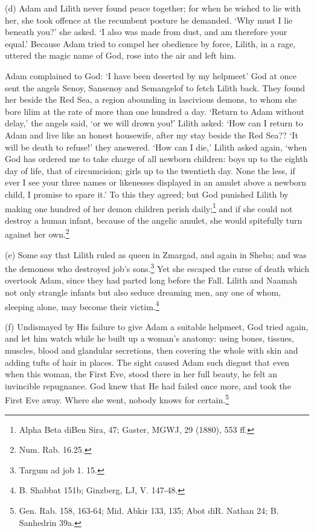 \documentclass{article}
\begin{document}
(d) Adam and Lilith never found peace together; for when he
wished to lie with her, she took offence at the recumbent posture
he demanded. `Why must I lie beneath you?' she asked. `I also was
made from dust, and am therefore your equal.' Because Adam tried
to compel her obedience by force, Lilith, in a rage, uttered the
magic name of God, rose into the air and left him.

Adam complained to God: `I have been deserted by my helpmeet' God
at once sent the angels Senoy, Sansenoy and Semangelof to fetch
Lilith back. They found her beside the Red Sea, a region abounding
in lascivious demons, to whom she bore lilim at the rate of more
than one hundred a day. `Return to Adam without delay,' the angels
said, `or we will drown you!' Lilith asked: `How can I return to
Adam and live like an honest housewife, after my stay beside the
Red Sea?? `It will be death to refuse!' they answered. `How can I
die,' Lilith asked again, `when God has ordered me to take charge
of all newborn children: boys up to the eighth day of life, that
of circumcision; girls up to the twentieth day. None the less, if
ever I see your three names or likenesses displayed in an amulet
above a newborn child, I promise to spare it.' To this they
agreed; but God punished Lilith by making one hundred of her demon
children perish 
daily;\footnote{Alpha Beta diBen Sira, 47; Gaster, MGWJ, 29 (1880), 553 ff.}
and if she could not destroy a human
infant, because of the angelic amulet, she would spitefully turn
against her own.\footnote{Num. Rab. 16.25.}

(e) Some say that Lilith ruled as queen in Zmargad, and again in
Sheba; and was the demoness who destroyed job's 
sons.\footnote{Targum ad job 1. 15.} Yet she escaped the curse of death which 
overtook Adam, since they had parted long before the Fall. Lilith and 
Naamah not only strangle infants but also seduce dreaming men, any one of 
whom, sleeping alone, may become their 
victim.\footnote{B. Shabbat 151b; Ginzberg, LJ, V. 147-48.}

(f) Undismayed by His failure to give Adam a suitable helpmeet,
God tried again, and let him watch while he built up a woman's
anatomy: using bones, tissues, muscles, blood and glandular
secretions, then covering the whole with skin and adding tufts of
hair in places. The sight caused Adam such disgust that even when
this woman, the First Eve, stood there in her full beauty, he felt
an invincible repugnance. God knew that He had failed once more,
and took the First Eve away. Where she went, nobody knows for
certain.\footnote{Gen. Rab. 158, 163-64; Mid. Abkir 133, 135; 
Abot diR. Nathan 24; B. Sanhedrin 39a.}
\end{document}
